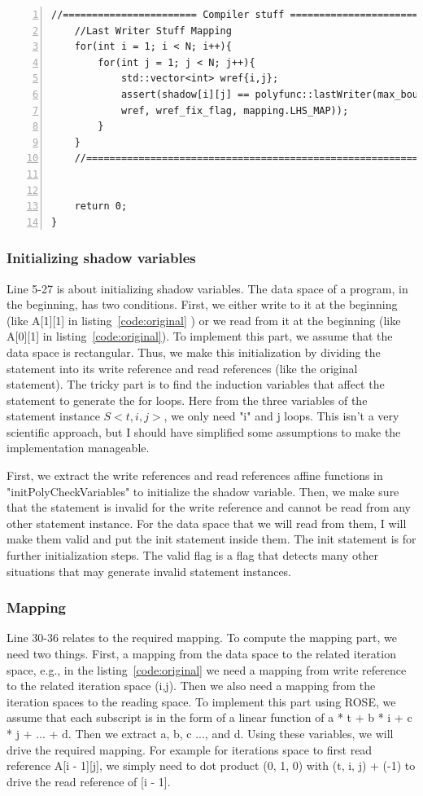 \documentclass[letterpaper,12pt]{article}
\begin{document}
\begin{lstlisting}[caption={The main function of the hand instrumented code}, label={code:main}, captionpos=b, numbers=left,
	stepnumber=1]
	//======================= Compiler stuff =======================
	//Last Writer Stuff Mapping
	for(int i = 1; i < N; i++){
		for(int j = 1; j < N; j++){
			std::vector<int> wref{i,j};
			assert(shadow[i][j] == polyfunc::lastWriter(max_bound,
			wref, wref_fix_flag, mapping.LHS_MAP));
		}
	}
	//================================================================
	
	
	return 0;
}
	\end{lstlisting}

	\subsubsection{Initializing shadow variables}
	
	
	Line 5-27 is about initializing shadow variables. The data space of a program, in the beginning, has two conditions. First, we either write to it at the beginning (like A[1][1] in listing~\ref{code:original} ) or we read from it at the beginning (like A[0][1] in listing~\ref{code:original}). To implement this part, we assume that the data space is rectangular. Thus, we make this initialization by dividing the statement into its write reference and read references (like the original statement). The tricky part is to find the induction variables that affect the statement to generate the for loops. Here from the three variables of the statement instance $S<t,i,j>$, we only need "i" and j loops. This isn't a very scientific approach, but I should have simplified some assumptions to make the implementation manageable. 

	First, we extract the write references and read references affine functions in "initPolyCheckVariables" to initialize the shadow variable. Then, we make sure that the statement is invalid for the write reference and cannot be read from any other statement instance. For the data space that we will read from them, I will make them valid and put the init statement inside them. The init statement is for further initialization steps. The valid flag is a flag that detects many other situations that may generate invalid statement instances. 

	
	\subsubsection{Mapping}
	
	Line 30-36 relates to the required mapping. To compute the mapping part, we need two things. First, a mapping from the data space to the related iteration space, e.g., in the listing~\ref{code:original} we need a mapping from write reference to the related iteration space (i,j). Then we also need a mapping from the iteration spaces to the reading space. To implement this part using ROSE, we assume that each subscript is in the form of a linear function of a * t + b * i + c * j + ... + d. Then we extract a, b, c ..., and d. Using these variables, we will drive the required mapping. For example for iterations space to first read reference A[i - 1][j], we simply need to dot product (0, 1, 0) with (t, i, j) + (-1) to drive the read reference of [i - 1].
	
\end{document}
